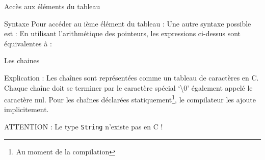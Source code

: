   	\begin{frame}{Accès aux éléments du tableau}
  		\begin{block}{Syntaxe}
  			Pour accéder au ième élément du tableau :
  			\arrayIndexAccess
  			Une autre syntaxe possible est :
  			\arrayIndexAccessTwo
  			En utilisant l'arithmétique des pointeurs, les expressions ci-dessus sont équivalentes à :
  			\arrayIndexAccessThree
  		\end{block}
  	\end{frame}
	
  	\begin{frame}{Les chaines}
  		\begin{block}{Explication :}
  			Les chaînes sont représentées comme un tableau de caractères en C. Chaque chaîne doit se terminer par le caractère spécial \alert{`\textbackslash0'} également appelé le caractère nul. Pour les chaînes déclarées statiquement\footnote[frame]{Au moment de la compilation}, le compilateur les ajoute implicitement.
  		\end{block}
  		\begin{alertblock}{ATTENTION :}
  			Le type \texttt{String} \alert{n'existe pas} en C !
  		\end{alertblock}
  	\end{frame}
  

